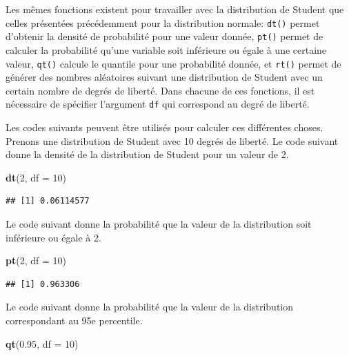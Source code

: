 \documentclass[
]{book}
\newenvironment{Shaded}{\begin{snugshade}}{\end{snugshade}}
\newcommand{\AttributeTok}[1]{\textcolor[rgb]{0.13,0.29,0.53}{#1}}
\newcommand{\DecValTok}[1]{\textcolor[rgb]{0.00,0.00,0.81}{#1}}
\newcommand{\FloatTok}[1]{\textcolor[rgb]{0.00,0.00,0.81}{#1}}
\newcommand{\FunctionTok}[1]{\textcolor[rgb]{0.13,0.29,0.53}{\textbf{#1}}}
\newcommand{\NormalTok}[1]{#1}
\begin{document}
Les mêmes fonctions existent pour travailler avec la distribution de Student que celles présentées précédemment pour la distribution normale: \texttt{dt()} permet d'obtenir la densité de probabilité pour une valeur donnée, \texttt{pt()} permet de calculer la probabilité qu'une variable soit inférieure ou égale à une certaine valeur, \texttt{qt()} calcule le quantile pour une probabilité donnée, et \texttt{rt()} permet de générer des nombres aléatoires suivant une distribution de Student avec un certain nombre de degrés de liberté. Dans chacune de ces fonctions, il est nécessaire de spécifier l'argument \texttt{df} qui correspond au degré de liberté.

Les codes suivants peuvent être utilisés pour calculer ces différentes choses. Prenons une distribution de Student avec 10 degrés de liberté. Le code suivant donne la densité de la distribution de Student pour un valeur de 2.

\begin{Shaded}
\begin{Highlighting}[]
\FunctionTok{dt}\NormalTok{(}\DecValTok{2}\NormalTok{, }\AttributeTok{df =} \DecValTok{10}\NormalTok{)}
\end{Highlighting}
\end{Shaded}

\begin{verbatim}
## [1] 0.06114577
\end{verbatim}

Le code suivant donne la probabilité que la valeur de la distribution soit inférieure ou égale à 2.

\begin{Shaded}
\begin{Highlighting}[]
\FunctionTok{pt}\NormalTok{(}\DecValTok{2}\NormalTok{, }\AttributeTok{df =} \DecValTok{10}\NormalTok{)}
\end{Highlighting}
\end{Shaded}

\begin{verbatim}
## [1] 0.963306
\end{verbatim}

Le code suivant donne la probabilité que la valeur de la distribution correspondant au 95e percentile.

\begin{Shaded}
\begin{Highlighting}[]
\FunctionTok{qt}\NormalTok{(}\FloatTok{0.95}\NormalTok{, }\AttributeTok{df =} \DecValTok{10}\NormalTok{)}
\end{Highlighting}
\end{Shaded}
\end{document}
